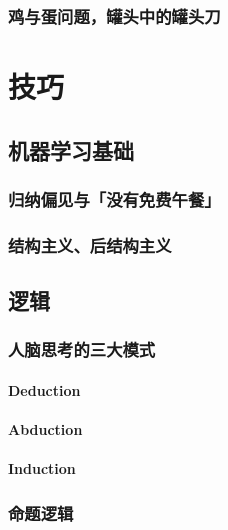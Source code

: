\documentclass[12pt, a4paper]{report}
\newcommand{\cc}[2]{#1}
\newcommand{\cc}[2]{#2}
\theoremstyle{examples} \newtheorem{example}{Example}[section]
\begin{document}
	\section{\cc{鸡与蛋问题，罐头中的罐头刀}{Chicken-and-egg problem}}

\part{\cc{技巧}{Techniques}}

\chapter{\cc{机器学习基础}{Machine learning basics}}

	\section{\cc{归纳偏见与「没有免费午餐」}{Inductive bias and ``no free lunch'' theorem}}
	\section{\cc{结构主义、后结构主义}{Structuralism, post-structuralism}}
	
\chapter{\cc{逻辑}{Logic}}

	\section{\cc{人脑思考的三大模式}{The 3 main modes of human thinking}}

		\subsection{Deduction}
		\subsection{Abduction}
		\subsection{Induction}

	\section{\cc{命题逻辑}{Propositional logic}}
	
\end{document}

